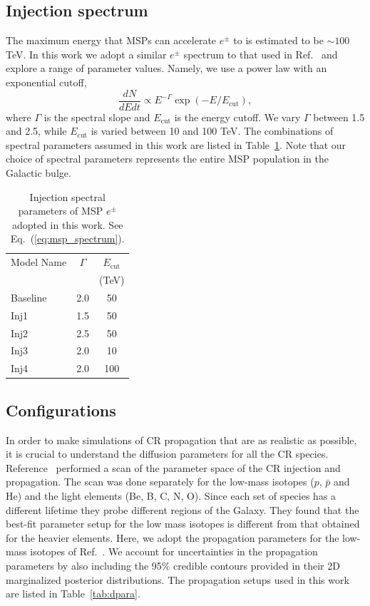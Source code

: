 \documentclass[doublespace,nopageskip]{VTthesis} %
\begin{document}
\subsection{Injection spectrum}\label{sec:spectrum}

The maximum energy that MSPs can accelerate $e^{\pm}$ to is estimated to be $\sim 100$ TeV. In this work we adopt a similar $e^\pm$ spectrum to that used in Ref.~\cite{Yuan:2014yda} and explore a range of parameter values. Namely, we use a power law with an exponential cutoff,
\begin{equation}
  \label{eq:msp_spectrum}
  \dfrac{dN}{dEdt} \propto E^{-\Gamma}\exp(-E/E_{\text{cut}}),
\end{equation}
where $\Gamma$ is the spectral slope and $E_{\text{cut}}$ is the energy cutoff. We vary $\Gamma$ between 1.5 and 2.5, while $E_{\text{cut}}$ is varied between 10 and 100 TeV. The combinations of spectral parameters assumed in this work are listed in Table~\ref{tab:msp_spectrum}. Note that our choice of spectral parameters represents the entire MSP population in the Galactic bulge.
\begin{table}[htb]
  \centering
  \caption{Injection spectral parameters of MSP $e^{\pm}$ adopted in this work. See Eq.~(\ref{eq:msp_spectrum}).}
    \begin{tabular}{lcc}
    \toprule
    Model Name&$\Gamma$ & $E_{\text{cut}}$\\
    & &  (TeV) \\
    \midrule
    Baseline &2.0 & 50 \\
    Inj1&1.5 & 50 \\
    Inj2&2.5 & 50 \\
    Inj3&2.0 & 10 \\
    Inj4&2.0 & 100\\
    \bottomrule
    \end{tabular}
  \label{tab:msp_spectrum}
\end{table}

\subsection{Configurations}

In order to make simulations of CR propagation that are as realistic as possible, it is crucial to understand the diffusion parameters for all the CR species. Reference~\cite{Johannesson:2016rlh} performed a scan of the parameter space of the CR injection and propagation. The scan was done separately for the low-mass isotopes ($p$, $\bar{p}$ and He) and the light elements (Be, B, C, N, O). Since each set of species has a different lifetime they probe different regions of the Galaxy. They found that the best-fit parameter setup for the low mass isotopes is different from that obtained for the heavier elements. Here, we adopt the propagation parameters for the low-mass isotopes of Ref.~\cite{Johannesson:2016rlh}. We account for uncertainties in the propagation parameters by also including the 95\% credible contours provided in their 2D marginalized posterior distributions. The propagation setups used in this work are listed in Table~\ref{tab:dpara}.
\end{document}
